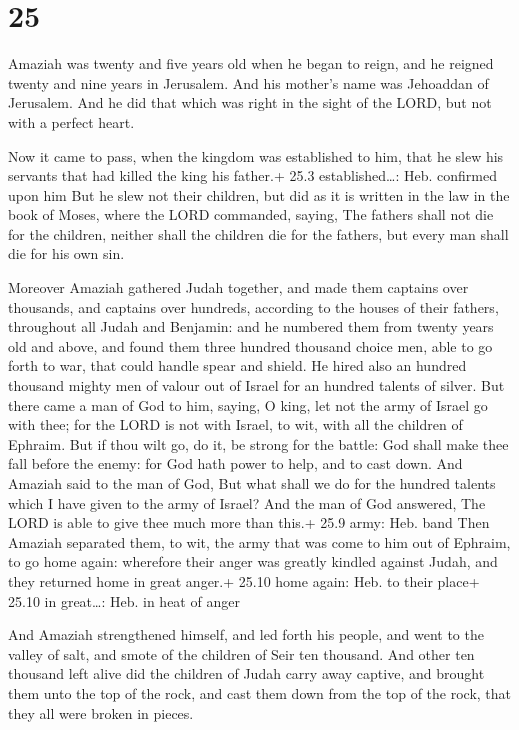\hypertarget{section-24}{%
\section{25}\label{section-24}}

 Amaziah was twenty and five years old when he began to
reign, and he reigned twenty and nine years in Jerusalem. And his
mother's name was Jehoaddan of Jerusalem.  And he did that
which was right in the sight of the LORD, but not with a perfect heart.

 Now it came to pass, when the kingdom was established to
him, that he slew his servants that had killed the king his father.+
25.3 established\ldots: Heb. confirmed upon him  But he slew
not their children, but did as it is written in the law in the book of
Moses, where the LORD commanded, saying, The fathers shall not die for
the children, neither shall the children die for the fathers, but every
man shall die for his own sin.

 Moreover Amaziah gathered Judah together, and made them
captains over thousands, and captains over hundreds, according to the
houses of their fathers, throughout all Judah and Benjamin: and he
numbered them from twenty years old and above, and found them three
hundred thousand choice men, able to go forth to war, that could handle
spear and shield.  He hired also an hundred thousand mighty
men of valour out of Israel for an hundred talents of silver.
 But there came a man of God to him, saying, O king, let not
the army of Israel go with thee; for the LORD is not with Israel, to
wit, with all the children of Ephraim.  But if thou wilt go,
do it, be strong for the battle: God shall make thee fall before the
enemy: for God hath power to help, and to cast down.  And
Amaziah said to the man of God, But what shall we do for the hundred
talents which I have given to the army of Israel? And the man of God
answered, The LORD is able to give thee much more than this.+ 25.9 army:
Heb. band  Then Amaziah separated them, to wit, the army
that was come to him out of Ephraim, to go home again: wherefore their
anger was greatly kindled against Judah, and they returned home in great
anger.+ 25.10 home again: Heb. to their place+ 25.10 in great\ldots:
Heb. in heat of anger

 And Amaziah strengthened himself, and led forth his
people, and went to the valley of salt, and smote of the children of
Seir ten thousand.  And other ten thousand left alive did
the children of Judah carry away captive, and brought them unto the top
of the rock, and cast them down from the top of the rock, that they all
were broken in pieces.

